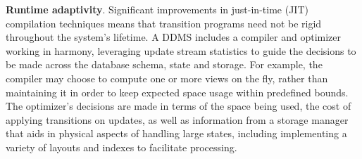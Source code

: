 {\bf Runtime adaptivity}\/.
Significant improvements in just-in-time (JIT) compilation techniques means that
transition programs need not be rigid throughout the system's lifetime. A DDMS
includes a compiler and optimizer working in harmony, leveraging update stream
statistics to guide the decisions to be made across the database schema, state
and storage. For example, the compiler may choose to compute one or more views
on the fly, rather than maintaining it in order to keep expected space usage
within predefined bounds. The optimizer's decisions are made in terms of the
space being used, the cost of applying transitions on updates, as well as
information from a storage manager that aids in physical aspects of handling
large states, including implementing a variety of layouts and indexes to
facilitate processing.










